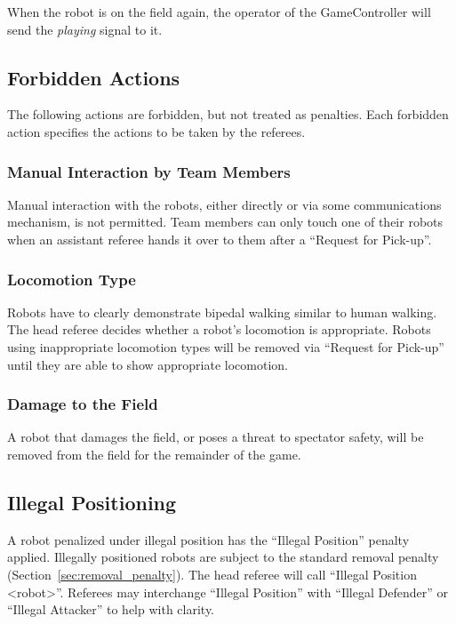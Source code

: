 When the robot is on the field again, the operator of the GameController will send the \emph{playing} signal to it.


\subsection{Forbidden Actions}

The following actions are forbidden, but not treated as penalties.
Each forbidden action specifies the actions to be taken by the referees.

\subsubsection{Manual Interaction by Team Members}

Manual interaction with the robots, either directly or via some communications mechanism, is not permitted.
Team members can only touch one of their robots when an assistant referee hands it over to them after a ``Request for Pick-up''.

\subsubsection{Locomotion Type}
\label{sec:locomotion_type}

Robots have to clearly demonstrate bipedal walking similar to human walking.
The head referee decides whether a robot's locomotion is appropriate. Robots using inappropriate locomotion types will be removed via ``Request for Pick-up'' until they are able to show appropriate locomotion.

\subsubsection{Damage to the Field}
\label{sec:damage}

A robot that damages the field, or poses a threat to spectator safety, will be removed from the field for the remainder of the game.

\subsection{Illegal Positioning}
\label{sec:illegal_positioning}

A robot penalized under illegal position has the ``Illegal Position'' penalty applied. Illegally positioned robots are subject to the standard removal penalty (\cf Section~\ref{sec:removal_penalty}).
The head referee will call ``Illegal Position  \textless robot\textgreater''.
Referees may interchange ``Illegal Position'' with ``Illegal Defender'' or ``Illegal Attacker'' to help with clarity.

